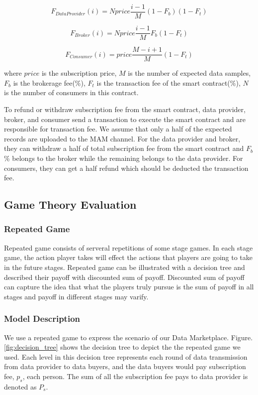 \documentclass[journal,a4paper]{IEEEtran}
\begin{document}
\begin{equation}
F_{DataProvider}(i) = N price \frac{i-1}{M} (1-F_{b}) (1-F_{t})
\end{equation}

\begin{equation}
F_{Broker}(i) = N price \frac{i-1}{M} F_{b} (1-F_{t})
\end{equation}

\begin{equation}
F_{Consumer}(i) = price \frac{M-i+1}{M} (1-F_{t})
\end{equation}

where $price$  is the subscription price, $M$ is the number of expected data samples, $F_{b}$ is the brokerage fee(\%), $F_{t}$ is the transaction fee of the smart contract(\%), $N$ is the number of consumers in this contract.

To refund or withdraw subscription fee from the smart contract, data provider, broker, and consumer send a transaction to execute the smart contract and are responsible for transaction fee. We assume that only a half of the expected records are uploaded to the MAM channel. For the data provider and broker, they can withdraw a half of total subscription fee from the smart contract and $F_{b}$ \% belongs to the broker while the remaining belongs to the data provider. For consumers, they can get a half refund which should be deducted the transaction fee.



\subsection{Game Theory Evaluation}
\subsubsection{Repeated Game}
Repeated game consists of serveral repetitions of some stage games. In each stage game, the action player takes will effect the actions that players are going to take in the future stages. Repeated game can be illustrated with a decision tree and described their payoff with discounted sum of payoff. Discounted sum of payoff can capture the idea that what the players truly pursue is the sum of payoff in all stages and payoff in different stages may varify.

\subsubsection{Model Description}
We use a repeated game to express the scenario of our Data Marketplace. Figure.\ref{fig:decision_tree} shows the decision tree to depict the the repeated game we used. Each level in this decision tree represents each round of data transmission from data provider to data buyers, and the data buyers would pay subscription fee, $p_s$, each person. The sum of all the subscription fee pays to data provider is denoted as $P_s$.
\end{document}
